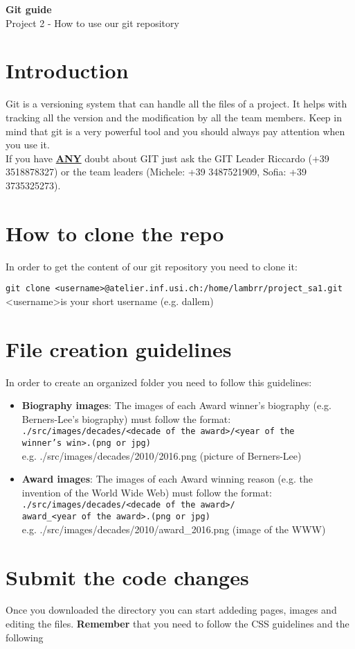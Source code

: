 \documentclass[a4paper,12pt]{article}
\newcommand{\<}{\textless}
\renewcommand{\>}{\textgreater}
\begin{document}
\begin{center}
 \huge{\textbf{Git guide}}\\[.5em]
 \Large{Project 2 - How to use our git repository}
\end{center}
\vspace{3em}
\tableofcontents

\newpage

\section{Introduction}
Git is a versioning system that can handle all the files of a project. It helps with tracking all the version and the modification by all the team members. Keep in mind that git is a very powerful tool and you should always pay attention when you use it.\\[.5em]
If you have \textbf{\underline{ANY}} doubt about GIT just ask the GIT Leader Riccardo (+39 3518878327) or the team leaders (Michele: +39 3487521909, Sofia: +39 3735325273).

\section{How to clone the repo}
In order to get the content of our git repository you need to clone it:
\begin{center}
 \small{\texttt{git clone <username>@atelier.inf.usi.ch:/home/lambrr/project\_sa1.git}}\\[.75em]
 \textless username\textgreater \enspace is your short username (e.g. dallem)
\end{center}

\section{File creation guidelines}
In order to create an organized folder you need to follow this guidelines:
\begin{itemize}
 \item \textbf{Biography images}: The images of each Award winner's biography (e.g. Berners-Lee's biography) must follow the format:\\ 
 \texttt{./src/images/decades/\<decade of the award\>/\<year of the\\winner's win\>.(png or jpg)}\\[.33em]
 e.g. ./src/images/decades/2010/2016.png (picture of Berners-Lee)
 
 \item \textbf{Award images}: The images of each Award winning reason (e.g. the invention of the World Wide Web) must follow the format:\\
 \texttt{./src/images/decades/\<decade of the award\>/\\award\_\<year of the award\>.(png or jpg)}\\[.33em] 
 e.g. ./src/images/decades/2010/award\_2016.png (image of the WWW)
 
 
\end{itemize}


\section{Submit the code changes}
Once you downloaded the directory you can start addeding pages, images and editing the files. 
\textbf{Remember} that you need to follow the CSS guidelines and the following 
\end{document}
